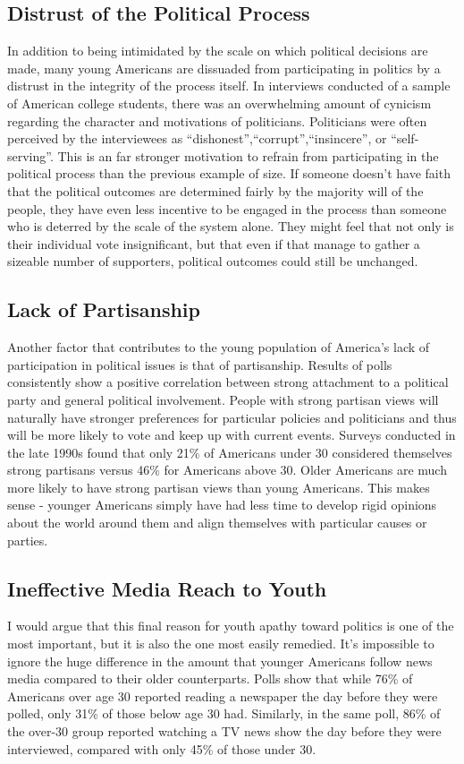 \documentclass[12pt,letterpaper]{article}
\begin{document}
\subsection{Distrust of the Political Process} In addition to being
intimidated by the scale on which political decisions are made, many
young Americans are dissuaded from participating in politics by a
distrust in the integrity of the process itself. In interviews
conducted of a sample of American college students, there was an
overwhelming amount of cynicism regarding the character and
motivations of politicians.  Politicians were often perceived by the
interviewees as ``dishonest'',``corrupt'',``insincere'', or
``self-serving''.  This is an far stronger motivation to refrain from
participating in the political process than the previous example of
size. If someone doesn't have faith that the political outcomes are
determined fairly by the majority will of the people, they have even
less incentive to be engaged in the process than someone who is
deterred by the scale of the system alone.  They might feel that not
only is their individual vote insignificant, but that even if that
manage to gather a sizeable number of supporters, political outcomes
could still be unchanged.

\subsection{Lack of Partisanship} Another factor that contributes to
the young population of America's lack of participation in political
issues is that of partisanship.  Results of polls consistently show a
positive correlation between strong attachment to a political party
and general political involvement.  People with strong partisan views
will naturally have stronger preferences for particular policies and
politicians and thus will be more likely to vote and keep up with
current events. Surveys conducted in the late 1990s found that only
21\% of Americans under 30 considered themselves strong partisans
versus 46\% for Americans above 30. Older Americans are much more
likely to have strong partisan views than young Americans.  This makes
sense - younger Americans simply have had less time to develop rigid
opinions about the world around them and align themselves with
particular causes or parties.  

\subsection{Ineffective Media Reach to Youth} I would argue that this
final reason for youth apathy toward politics is one of the most
important, but it is also the one most easily remedied.  It's
impossible to ignore the huge difference in the amount that younger
Americans follow news media compared to their older counterparts.
Polls show that while 76\% of Americans over age 30 reported reading a
newspaper the day before they were polled, only 31\% of those below
age 30 had. Similarly, in the same poll, 86\% of the over-30 group
reported watching a TV news show the day before they were interviewed,
compared with only 45\% of those under 30.  
\end{document}
